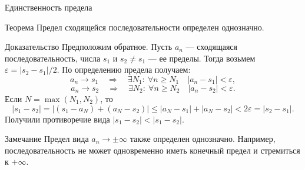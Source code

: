 \documentclass[8pt]{beamer}
\begin{document}
\begin{frame}{Единственность предела}
\begin{block}{Теорема}
Предел сходящейся последовательности определен однозначно.
\end{block}
\begin{block}{Доказательство}
Предположим обратное. Пусть $a_n$ --- сходящаяся последовательность, числа $s_1$ и $s_2\ne s_1$  --- ее пределы. Тогда возьмем $\varepsilon=|s_2-s_1|/2$. По определению предела получаем:
$$a_n\to s_1 \quad \Rightarrow \quad \exists N_1:\ \forall n\ge N_1\quad |a_n-s_1|<\varepsilon,$$
$$a_n\to s_2 \quad \Rightarrow \quad \exists N_2:\ \forall n\ge N_2\quad |a_n-s_2|<\varepsilon.$$
Если $N=\max(N_1,N_2)$, то
$$|s_1 - s_2|=|(s_1 - a_N) + (a_N - s_2)|\le |a_N - s_1| + |a_N - s_2| < 2\varepsilon = |s_2 - s_1|.$$
Получили противоречие вида $|s_1-s_2|<|s_1 - s_2|$.
\end{block}

\begin{block}{Замечание}
Предел вида $a_n\to \pm\infty$ также определен однозначно. Например, последовательность не может одновременно иметь конечный предел и стремиться к $+\infty$.
\end{block}

\end{frame}

\end{document}
